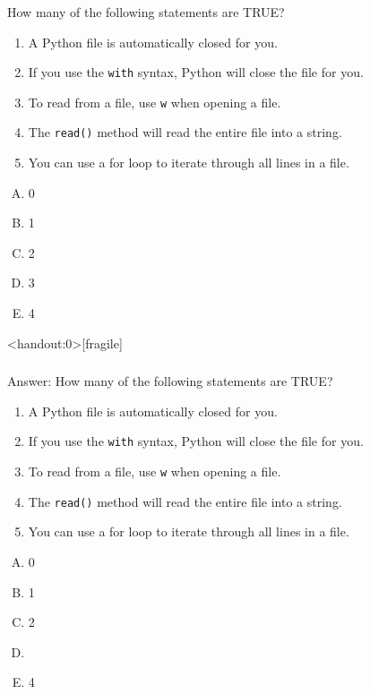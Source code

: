 \documentclass[xcolor=svgnames]{beamer}
\newcommand{\tans}[2]{\textbf<#1>{\textit<#1>{{\color<#1>{iyellow}{#2}}}}}
\newcommand{\ft}[1]{\frametitle{#1}}
\begin{document}
\begin{frame}[fragile]\ft{}
  \begin{example}
How many of the following statements are TRUE?
\begin{enumerate}
\item {{A Python file is automatically closed for you.
}}
\item {{If you use the {\tt with} syntax, Python will close the file for you.
}}
\item {{To read from a file, use {\tt w} when opening a file.
}}
\item {{The {\tt read()} method will read the entire file into a string.
}} 
\item {{You can use a for loop to iterate through all lines in a file.}} 
\end{enumerate}
\begin{multicols}{5}
\begin{enumerate}[A)]
\item 0 
\item 1
\item 2
\item 3
\item 4
\end{enumerate}
\end{multicols}
  \end{example} 
\end{frame}



\begin{frame}<handout:0>[fragile]\ft{}
  \begin{block}{Answer:}
How many of the following statements are TRUE?
\begin{enumerate}
\item {	{A Python file is automatically closed for you.
}}
\item {	{If you use the {\tt with} syntax, Python will close the file for you.
}}
\item {	{To read from a file, use {\tt w} when opening a file.
}}
\item {	{The {\tt read()} method will read the entire file into a string.
}} 
\item {	{You can use a for loop to iterate through all lines in a file.}} 
\end{enumerate}
\begin{multicols}{5}
\begin{enumerate}[A)]
\item 0 
\item 1
\item 2
\item \tans{5}{3} 
\item 4
\end{enumerate}
\end{multicols}
  \end{block} 
\end{frame}
\end{document}
